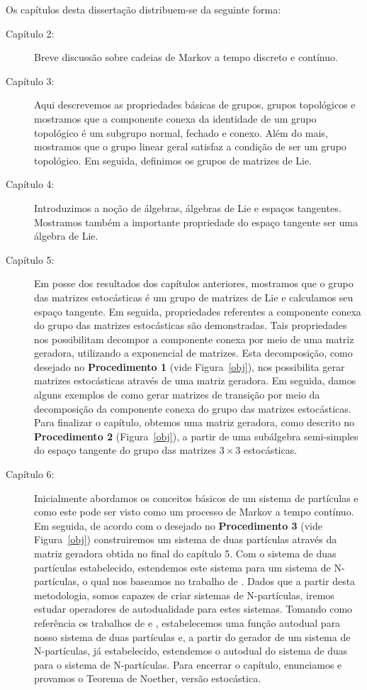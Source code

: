 \documentclass[twoside,openright,titlepage,numbers=noenddot,headinclude,  lineheaders footinclude=true,cleardoublepage=empty,
                                BCOR=5mm,paper=a4,fontsize=12pt ]{scrbook}
\theoremstyle{definition}
\begin{document}
Os capítulos desta dissertação distribuem-se da seguinte forma: 
\begin{description}
    \item[Cap\'itulo 2:] Breve discussão sobre cadeias de Markov a tempo discreto
	e contínuo. 
    \item[Cap\'itulo 3:] Aqui descrevemos as propriedades básicas de grupos, grupos topológicos e
    mostramos que a componente conexa da identidade de um grupo topológico é um subgrupo normal, fechado
    e conexo. Além do mais, mostramos que o grupo linear geral satisfaz a condição de ser um grupo topológico.
    Em seguida, definimos os grupos de matrizes de Lie.
    \item[Cap\'itulo 4:] Introduzimos a noção de álgebras, álgebras de Lie e espaços tangentes.
    Mostramos também a importante propriedade do espaço tangente ser uma álgebra de Lie.
    \item[Cap\'itulo 5:] Em posse dos resultados dos capítulos anteriores, mostramos que o
    grupo das matrizes estocásticas é um grupo de matrizes de Lie e calculamos seu espaço
    tangente. Em seguida, propriedades referentes a componente conexa do grupo das matrizes estocásticas
    são demonstradas. Tais propriedades nos possibilitam decompor a componente conexa por meio
    de uma matriz geradora, utilizando a exponencial de matrizes. Esta decomposição, como desejado
    no \textbf{Procedimento 1} (vide Figura~\ref{obj}), nos possibilita gerar matrizes estocásticas através de uma
    matriz geradora. Em seguida, damos alguns exemplos de como gerar matrizes de transição por
    meio da decomposição da componente conexa do grupo das matrizes estocásticas.
	Para finalizar o capítulo, obtemos uma matriz geradora, como descrito no \textbf{Procedimento 2} (Figura~\ref{obj}),
    a partir de uma subálgebra semi-simples do espaço tangente  do grupo das matrizes $3 \times 3$
	estocásticas.
	\item[Cap\'itulo 6:] Inicialmente abordamos os conceitos básicos de um sistema de partículas
	e como este pode ser visto como um processo de Markov a tempo contínuo. Em seguida, 
	de acordo com o desejado no \textbf{Procedimento 3} (vide Figura~\ref{obj}) construiremos
	um sistema de duas partículas através da matriz geradora obtida no final do capítulo 5.
	Com o sistema de duas partículas estabelecido, estendemos este sistema para um sistema
	de N-partículas, o qual nos  baseamos no trabalho de \cite{Nparticulas}. Dados que a
	partir desta metodologia, somos capazes de criar sistemas de N-partículas, iremos
	estudar operadores de autodualidade para estes sistemas. Tomando como referência
	os trabalhos de \cite{daniela} e \cite{redig}, estabelecemos uma função autodual
	para nosso sistema de duas partículas e, a partir do gerador de um sistema de
	N-partículas, já estabelecido, estendemos o autodual do sistema de duas
	para o sistema de N-partículas. Para encerrar o capítulo, enunciamos e provamos
	o Teorema de Noether, versão estocástica.
 
\end{description}
\end{document}
